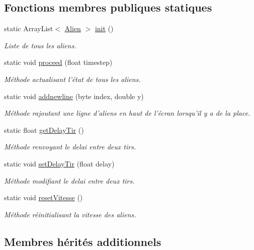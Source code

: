 \subsection*{Fonctions membres publiques statiques}
\begin{DoxyCompactItemize}
\item 
static Array\-List$<$ \hyperlink{class_alien}{Alien} $>$ \hyperlink{class_alien_a728d462c9cc08f7ff5f05fb615b73d90}{init} ()
\begin{DoxyCompactList}\small\item\em Liste de tous les aliens. \end{DoxyCompactList}\item 
static void \hyperlink{class_alien_a31f78c3f88539292bd6dc386d573229f}{proceed} (float timestep)
\begin{DoxyCompactList}\small\item\em Méthode actualisant l'état de tous les aliens. \end{DoxyCompactList}\item 
static void \hyperlink{class_alien_a4590038c5fbebdff0478d3436c86fa57}{addnewline} (byte index, double y)
\begin{DoxyCompactList}\small\item\em Méthode rajoutant une ligne d'aliens en haut de l'écran lorsqu'il y a de la place. \end{DoxyCompactList}\item 
static float \hyperlink{class_alien_af08813497b68cf8a37fe1fb102e8ff49}{get\-Delay\-Tir} ()
\begin{DoxyCompactList}\small\item\em Méthode renvoyant le delai entre deux tirs. \end{DoxyCompactList}\item 
static void \hyperlink{class_alien_a3a95e4b5e9e78e0d2355fd344b887569}{set\-Delay\-Tir} (float delay)
\begin{DoxyCompactList}\small\item\em Méthode modifiant le delai entre deux tirs. \end{DoxyCompactList}\item 
static void \hyperlink{class_alien_ae9744d3b25e37ce733608ebd6ef4a789}{reset\-Vitesse} ()
\begin{DoxyCompactList}\small\item\em Méthode réinitialisant la vitesse des aliens. \end{DoxyCompactList}\end{DoxyCompactItemize}
\subsection*{Membres hérités additionnels}


